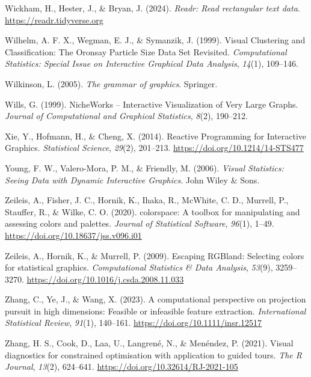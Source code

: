 \documentclass[
  letterpaper,
]{krantz}
\newlength{\cslhangindent}
\newenvironment{CSLReferences}[2] %
 {\begin{list}{}{%
  \setlength{\itemindent}{0pt}
  \setlength{\leftmargin}{0pt}
  \setlength{\parsep}{0pt}
  \ifodd #1
   \setlength{\leftmargin}{\cslhangindent}
   \setlength{\itemindent}{-1\cslhangindent}
  \fi
  \setlength{\itemsep}{#2\baselineskip}}}
 {\end{list}}
\begin{document}
\begin{CSLReferences}{1}{0}
Wickham, H., Hester, J., \& Bryan, J. (2024). \emph{Readr: Read
rectangular text data}. \url{https://readr.tidyverse.org}

Wilhelm, A. F. X., Wegman, E. J., \& Symanzik, J. (1999). Visual
{C}lustering and {C}lassification: {T}he {O}ronsay {P}article {S}ize
{D}ata {S}et {R}evisited. \emph{Computational Statistics: Special Issue
on Interactive Graphical Data Analysis}, \emph{14}(1), 109--146.

Wilkinson, L. (2005). \emph{The grammar of graphics}. Springer.

Wills, G. (1999). NicheWorks -- {I}nteractive {V}isualization of {V}ery
{L}arge {G}raphs. \emph{Journal of Computational and Graphical
Statistics}, \emph{8}(2), 190--212.

Xie, Y., Hofmann, H., \& Cheng, X. (2014). {Reactive Programming for
Interactive Graphics}. \emph{Statistical Science}, \emph{29}(2),
201--213. \url{https://doi.org/10.1214/14-STS477}

Young, F. W., Valero-Mora, P. M., \& Friendly, M. (2006). \emph{Visual
{S}tatistics: {S}eeing {D}ata with {D}ynamic {I}nteractive {G}raphics}.
John Wiley \& Sons.

Zeileis, A., Fisher, J. C., Hornik, K., Ihaka, R., McWhite, C. D.,
Murrell, P., Stauffer, R., \& Wilke, C. O. (2020). {colorspace}: A
toolbox for manipulating and assessing colors and palettes.
\emph{Journal of Statistical Software}, \emph{96}(1), 1--49.
\url{https://doi.org/10.18637/jss.v096.i01}

Zeileis, A., Hornik, K., \& Murrell, P. (2009). Escaping {RGB}land:
Selecting colors for statistical graphics. \emph{Computational
Statistics \& Data Analysis}, \emph{53}(9), 3259--3270.
\url{https://doi.org/10.1016/j.csda.2008.11.033}

Zhang, C., Ye, J., \& Wang, X. (2023). A computational perspective on
projection pursuit in high dimensions: Feasible or infeasible feature
extraction. \emph{International Statistical Review}, \emph{91}(1),
140--161. \url{https://doi.org/10.1111/insr.12517}

Zhang, H. S., Cook, D., Laa, U., Langrené, N., \& Menéndez, P. (2021).
Visual diagnostics for constrained optimisation with application to
guided tours. \emph{The R Journal}, \emph{13}(2), 624--641.
\url{https://doi.org/10.32614/RJ-2021-105}


\end{CSLReferences}
\end{document}
